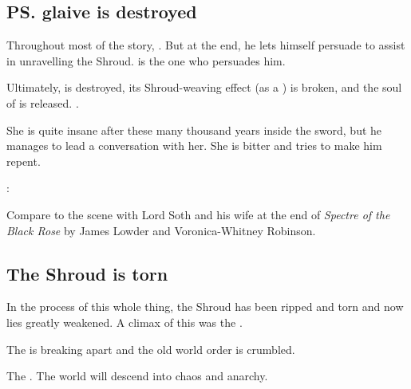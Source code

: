 \subsection{\ps{\Ishnaruchaefir} glaive is destroyed}
Throughout most of the story, . But at the end, he lets himself persuade to assist in unravelling the Shroud. \Triestessakhin{} is the one who persuades him. 

Ultimately,  is destroyed, its Shroud-weaving effect (as a ) is broken, and the soul of \Triestessakhin{} is released. 
. 

She is quite insane after these many thousand years inside the sword, but he manages to lead a conversation with her. She is bitter and tries to make him repent. 

\Ishnaruchaefir: 

Compare to the scene with Lord Soth and his wife at the end of \emph{Spectre of the Black Rose} by James Lowder and Voronica-Whitney Robinson. 









\subsection{The Shroud is torn}
In the process of this whole thing, the Shroud has been ripped and torn and now lies greatly weakened. A climax of this was the . 

The \charade{} is breaking apart and the old world order is crumbled. 

The . 
The world will descend into chaos and anarchy. 

